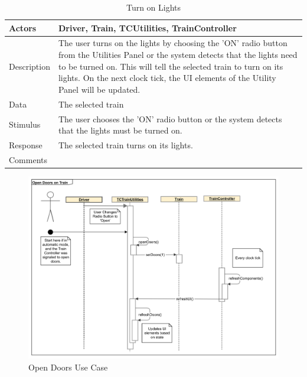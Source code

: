 \documentclass[]{article}
\begin{document}
\begin{table}[H]
	\centering
	\caption{Turn on Lights}
	\begin{tabular}{|l|l|}
		\hline
		Actors & \parbox[t]{10cm}{Driver, Train, TCUtilities, TrainController} \\ \hline
		Description & \parbox[t]{10cm}{The user turns on the lights by choosing the 'ON' radio button from the Utilities Panel or the system detects that the lights need to be turned on. This will tell the selected train to turn on its lights. On the next clock tick, the UI elements of the Utility Panel will be updated.} \\ \hline
		Data &  \parbox[t]{10cm}{The selected train} \\ \hline
		Stimulus &  \parbox[t]{10cm}{The user chooses the 'ON' radio button or the system detects that the lights must be turned on.  } \\ \hline
		Response & \parbox[t]{10cm}{The selected train turns on its lights. }\\ \hline
		Comments & \parbox[t]{10cm}{}  \\ \hline
	\end{tabular}
\end{table}

\begin{figure}[H]
	\centering
	\includegraphics[scale=.3]{tc_openDoors_usecase}
	\caption{Open Doors Use Case}
\end{figure}
\end{document}
